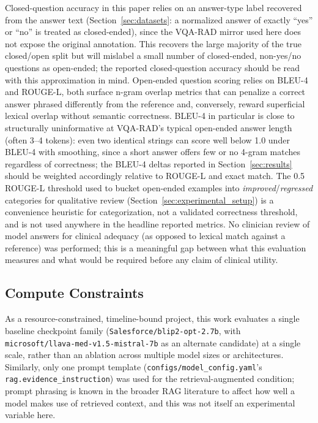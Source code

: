 Closed-question accuracy in this paper relies on an answer-type label
recovered from the answer text (Section~\ref{sec:datasets}: a normalized
answer of exactly ``yes'' or ``no'' is treated as closed-ended), since
the VQA-RAD mirror used here does not expose the original annotation.
This recovers the large majority of the true closed/open split but will
mislabel a small number of closed-ended, non-yes/no questions as
open-ended; the reported closed-question accuracy should be read with
this approximation in mind. Open-ended question scoring relies on
BLEU-4 and ROUGE-L, both surface n-gram overlap metrics that can penalize
a correct answer phrased differently from the reference and, conversely,
reward superficial lexical overlap without semantic correctness. BLEU-4
in particular is close to structurally uninformative at VQA-RAD's typical
open-ended answer length (often 3--4 tokens): even two identical strings
can score well below 1.0 under BLEU-4 with smoothing, since a short
answer offers few or no 4-gram matches regardless of correctness; the
BLEU-4 deltas reported in Section~\ref{sec:results} should be weighted
accordingly relative to ROUGE-L and exact match. The 0.5 ROUGE-L
threshold used to bucket open-ended examples into
\emph{improved}/\emph{regressed} categories for qualitative review
(Section~\ref{sec:experimental_setup}) is a convenience heuristic for
categorization, not a validated correctness threshold, and is not used
anywhere in the headline reported metrics. No clinician review of model
answers for clinical adequacy (as opposed to lexical match against a
reference) was performed; this is a meaningful gap between what this
evaluation measures and what would be required before any claim of
clinical utility.

\subsection{Compute Constraints}

As a resource-constrained, timeline-bound project, this work evaluates a
single baseline checkpoint family
(\texttt{Salesforce/blip2-opt-2.7b}, with
\texttt{microsoft/llava-med-v1.5-mistral-7b} as an alternate candidate) at
a single scale, rather than an ablation across multiple model sizes or
architectures. Similarly, only one prompt template
(\texttt{configs/model\_config.yaml}'s \texttt{rag.evidence\_instruction})
was used for the retrieval-augmented condition; prompt phrasing is known in
the broader RAG literature to affect how well a model makes use of
retrieved context, and this was not itself an experimental variable here.

